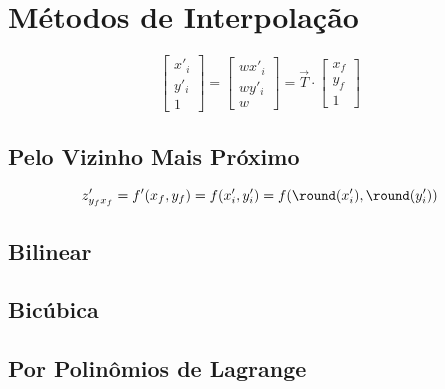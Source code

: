 \section{Métodos de Interpolação} \label{sec:interp}

\[
    \begin{bmatrix}
        x'_i \\
        y'_i \\
        1
    \end{bmatrix}
    = \begin{bmatrix}
        w x'_i \\
        w y'_i \\
        w
    \end{bmatrix}
    = \vec{T} \cdot \begin{bmatrix}
        x_f \\
        y_f \\
        1
    \end{bmatrix}
\]

\subsection{Pelo Vizinho Mais Próximo} \label{sec:interp:vizinho}

\[
    z'_{y_f x_f} = f'(x_f, y_f) = f(x'_i, y'_i) = f(\round(x'_i), \round(y'_i))
\]

\subsection{Bilinear} \label{sec:interp:bilinear}

\subsection{Bicúbica} \label{sec:interp:bicubica}

\subsection{Por Polinômios de Lagrange} \label{sec:interp:lagrange}
